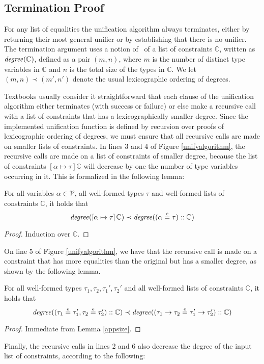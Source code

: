 \subsection{Termination Proof}
\label{termination}

\newcommand{\degree}{\text{\it degree\/}}

For any list of equalities the unification algorithm always
terminates, either by returning their most general unifier or by
establishing that there is no unifier. The termination argument uses a
notion of \degree\ of a list of constraints $\mathbb{C}$, written as
$\degree(\mathbb{C})$, defined as a pair $(m,n)$, where $m$ is the
number of distinct type variables in $\mathbb{C}$ and $n$ is the total
size of the types in $\mathbb{C}$. We let $(m,n)\prec (m',n')$ denote
the usual lexicographic ordering of degrees.

Textbooks usually consider it straightforward that each clause of the
unification algorithm either terminates (with success or failure) or
else make a recursive call with a list of constraints that has a
lexicographically smaller degree. Since the implemented unification
function is defined by recursion over proofs of lexicographic ordering
of degrees, we must ensure that all recursive calls are made on
smaller lists of constraints.  In lines 3 and 4 of Figure
\ref{unifyalgorithm}, the recursive calls are made on a list of
constraints of smaller degree, because the list of constraints
$[\alpha\mapsto\tau]\mathbb{C}$ will decrease by one the number of
type variables occurring in it. This is formalized in the following
lemma:

\begin{Lemma}\label{lem-termination-1}
For all variables $\alpha \in \mathcal{V}$, all well-formed types
$\tau$ and well-formed lists of constraints $\mathbb{C}$, it holds
that 
  \[ \degree([\alpha\mapsto \tau]\,\mathbb{C})\prec 
     \degree((\alpha \eeq \tau) :: \mathbb{C})\]
\end{Lemma}
\begin{proof}
Induction over $\mathbb{C}$. 
\end{proof}

On line 5 of Figure \ref{unifyalgorithm}, we have that the recursive
call is made on a constraint that has more equalities than the
original but has a smaller degree, as shown by the following lemma.

\begin{Lemma}\label{lem-termination-2}
For all well-formed types $\tau_1, \tau_2, \tau_1', \tau_2'$ and all well-formed lists of constraints $\mathbb{C}$, it holds that
\[\degree((\tau_1\eeq\tau_1',\tau_2\eeq\tau_2') :: \mathbb{C})
\prec
\degree((\tau_1\to\tau_2\eeq\tau_1'\to\tau_2') :: \mathbb{C})\]
\end{Lemma}
\begin{proof}
Immediate from Lemma \ref{appsize}.
\end{proof}
Finally, the recursive calls in lines 2 and 6 also decrease the degree
of the input list of constraints, according to the following:

